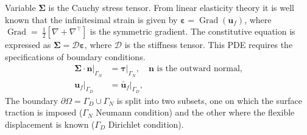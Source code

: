 \documentclass{svjour3}                     %
\DeclareMathOperator*{\Grad}{Grad}
\newcommand{\secondRev}[1]{\textcolor{blue!80!black}{#1}}
\begin{document}
\begin{itemize}
\begin{equation}
		\end{equation}
		Variable $\bm\Sigma$ is the Cauchy stress tensor. From linear elasticity theory it is well known that the infinitesimal \secondRev{strain} is given by $\bm\varepsilon = \Grad(\bm{u}_f)$, where $\Grad=~\frac{1}{2}[\nabla+\nabla^\top]$ is the symmetric gradient. The constitutive equation is expressed as $\bm\Sigma =  \bm{\mathcal{D}} \bm\varepsilon$, where $ \bm{\mathcal{D}}$ is the stiffness tensor. This PDE requires the specifications of boundary conditions.
		\begin{equation}
		\label{eq:bcPDE}
		\begin{aligned}
		\bm\Sigma \cdot \bm{n}|_{\Gamma_N} &= \bm\tau|_{\Gamma_N}, \quad \text{$\bm{n}$ is the outward normal,} \\
		\bm{u}_f|_{\Gamma_D} &= \bm{\bar{u}}_f|_{\Gamma_D},
		\end{aligned}
		\end{equation}
		The boundary $\partial \Omega = \Gamma_D \cup \Gamma_N$ is split into two subsets, one on which the surface traction is imposed ($\Gamma_N$ Neumann condition) and the other where the flexible displacement is known ($\Gamma_D$ Dirichlet condition). 
	\end{itemize}
	
\end{document}
